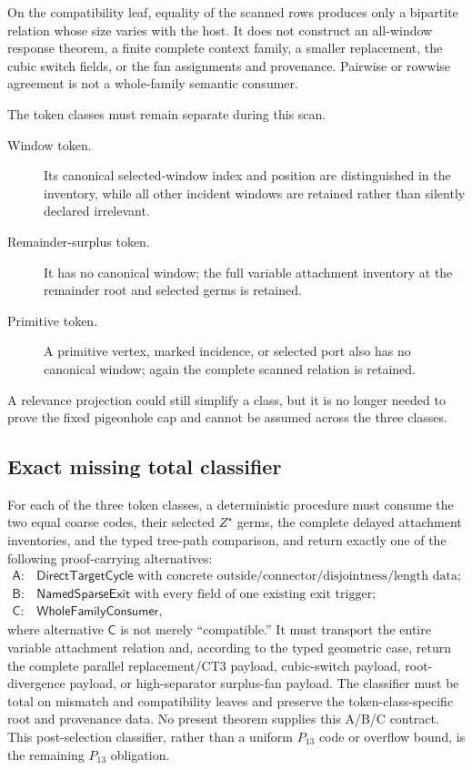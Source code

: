 \documentclass[11pt]{article}
\begin{document}
On the compatibility leaf, equality of the scanned rows produces only a
bipartite relation whose size varies with the host.  It does not construct an
all-window response theorem, a finite complete context family, a smaller
replacement, the cubic switch fields, or the fan assignments and provenance.
Pairwise or rowwise agreement is not a whole-family semantic consumer.

The token classes must remain separate during this scan.
\begin{description}
\item[Window token.] Its canonical selected-window index and position are
distinguished in the inventory, while all other incident windows are retained
rather than silently declared irrelevant.
\item[Remainder-surplus token.] It has no canonical window; the full variable
attachment inventory at the remainder root and selected germs is retained.
\item[Primitive token.] A primitive vertex, marked incidence, or selected port
also has no canonical window; again the complete scanned relation is retained.
\end{description}
A relevance projection could still simplify a class, but it is no longer
needed to prove the fixed pigeonhole cap and cannot be assumed across the
three classes.

\subsection*{Exact missing total classifier}
For each of the three token classes, a deterministic procedure must consume
the two equal coarse codes, their selected $Z^\star$ germs, the complete
delayed attachment inventories, and the typed tree-path comparison, and return
exactly one of the following proof-carrying alternatives:
\[
\begin{array}{ll}
\mathsf{A}:&\mathsf{DirectTargetCycle}
  \text{ with concrete outside/connector/disjointness/length data};\\
\mathsf{B}:&\mathsf{NamedSparseExit}
  \text{ with every field of one existing exit trigger};\\
\mathsf{C}:&\mathsf{WholeFamilyConsumer},
\end{array}                                                   \tag{O144}
\]
where alternative $\mathsf C$ is not merely ``compatible.''  It must transport
the entire variable attachment relation and, according to the typed geometric
case, return the complete parallel replacement/CT3 payload, cubic-switch
payload, root-divergence payload, or high-separator surplus-fan payload.  The
classifier must be total on mismatch and compatibility leaves and preserve the
token-class-specific root and provenance data.  No present theorem supplies
this A/B/C contract.  This post-selection classifier, rather than a uniform
$P_{13}$ code or overflow bound, is the remaining $P_{13}$ obligation.
\end{document}
